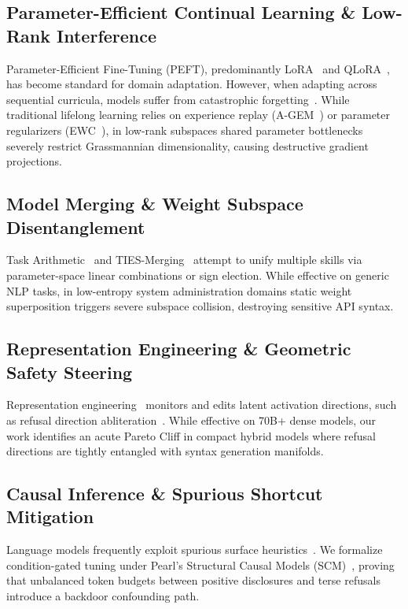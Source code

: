 \documentclass{article}
\begin{document}
\subsection{Parameter-Efficient Continual Learning \& Low-Rank Interference}
Parameter-Efficient Fine-Tuning (PEFT), predominantly LoRA~\cite{hu2022lora} and QLoRA~\cite{dettmers2023qlora}, has become standard for domain adaptation. However, when adapting across sequential curricula, models suffer from catastrophic forgetting~\cite{biderman2024lora}. While traditional lifelong learning relies on experience replay (A-GEM~\cite{chaudhry2019efficient}) or parameter regularizers (EWC~\cite{kirkpatrick2017overcoming}), in low-rank subspaces shared parameter bottlenecks severely restrict Grassmannian dimensionality, causing destructive gradient projections.

\subsection{Model Merging \& Weight Subspace Disentanglement}
Task Arithmetic~\cite{ilharco2022editing} and TIES-Merging~\cite{yadav2023ties} attempt to unify multiple skills via parameter-space linear combinations or sign election. While effective on generic NLP tasks, in low-entropy system administration domains static weight superposition triggers severe subspace collision, destroying sensitive API syntax.

\subsection{Representation Engineering \& Geometric Safety Steering}
Representation engineering~\cite{zou2023representation} monitors and edits latent activation directions, such as refusal direction abliteration~\cite{arditi2024refusal}. While effective on 70B+ dense models, our work identifies an acute Pareto Cliff in compact hybrid models where refusal directions are tightly entangled with syntax generation manifolds.

\subsection{Causal Inference \& Spurious Shortcut Mitigation}
Language models frequently exploit spurious surface heuristics~\cite{wang2023self}. We formalize condition-gated tuning under Pearl's Structural Causal Models (SCM)~\cite{pearl2009causality}, proving that unbalanced token budgets between positive disclosures and terse refusals introduce a backdoor confounding path.
\end{document}
